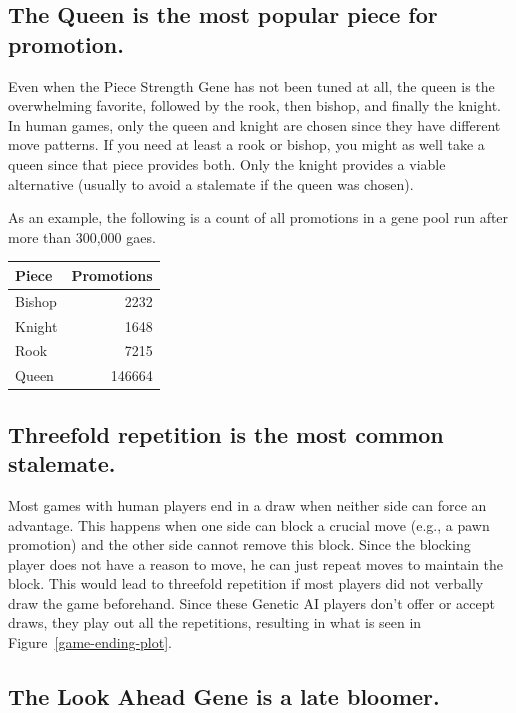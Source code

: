\documentclass[letterpaper]{article}
\renewcommand\_{\textunderscore\allowbreak}
\begin{document}
\subsection{The Queen is the most popular piece for promotion.}

Even when the Piece Strength Gene has not been tuned at all, the queen is the overwhelming favorite, followed by the rook, then bishop, and finally the knight. In human games, only the queen and knight are chosen since they have different move patterns. If you need at least a rook or bishop, you might as well take a queen since that piece provides both. Only the knight provides a viable alternative (usually to avoid a stalemate if the queen was chosen).

As an example, the following is a count of all promotions in a gene pool run after more than 300,000 gaes.
\begin{center}
\begin{tabular}{l|r}
	Piece & Promotions \\
\hline
	Bishop & 2232  \\
	Knight  &  1648 \\
	Rook    &  7215 \\
	Queen  & 146664 \\
\end{tabular}
\end{center}


\subsection{Threefold repetition is the most common stalemate.}

Most games with human players end in a draw when neither side can force an advantage. This happens when one side can block a crucial move (e.g., a pawn promotion) and the other side cannot remove this block. Since the blocking player does not have a reason to move, he can just repeat moves to maintain the block. This would lead to threefold repetition if most players did not verbally draw the game beforehand. Since these Genetic AI players don't offer or accept draws, they play out all the repetitions, resulting in what is seen in Figure~\ref{game-ending-plot}.

\subsection{The Look Ahead Gene is a late bloomer.}
\end{document}
